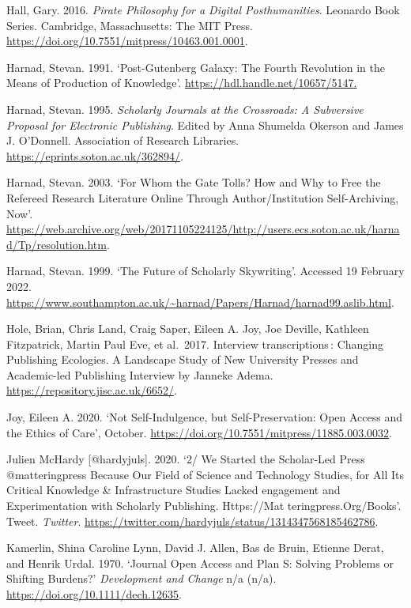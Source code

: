 \documentclass[a4paper,
fontsize=11pt,
oneside,
numbers=noperiodatend,
parskip=half-,
bibliography=totoc,
final
]{scrartcl}
\begin{document}
Hall, Gary. 2016. \emph{Pirate Philosophy for a Digital Posthumanities}.
Leonardo Book Series. Cambridge, Massachusetts: The MIT Press.
\url{https://doi.org/10.7551/mitpress/10463.001.0001}.

Harnad, Stevan. 1991. \enquote*{Post-Gutenberg Galaxy: The Fourth
Revolution in the Means of Production of Knowledge}.
\url{https://hdl.handle.net/10657/5147}\href{https://uh-ir.tdl.org/handle/10657/5147}{.}

Harnad, Stevan. 1995. \emph{Scholarly Journals at the Crossroads: A
Subversive Proposal for Electronic Publishing}. Edited by Anna Shumelda
Okerson and James J. O'Donnell. Association of Research Libraries.
\url{https://eprints.soton.ac.uk/362894/}.

Harnad, Stevan. 2003. \enquote*{For Whom the Gate Tolls? How and Why to
Free the Refereed Research Literature Online Through Author/Institution
Self-Archiving, Now}.
\url{https://web.archive.org/web/20171105224125/http://users.ecs.soton.ac.uk/harnad/Tp/resolution.htm}.

Harnad, Stevan. 1999. \enquote*{The Future of Scholarly Skywriting}.
Accessed 19 February 2022.
\url{https://www.southampton.ac.uk/~harnad/Papers/Harnad/harnad99.aslib.html}.

Hole, Brian, Chris Land, Craig Saper, Eileen A. Joy, Joe Deville,
Kathleen Fitzpatrick, Martin Paul Eve, et al.~2017. Interview
transcriptions\,: Changing Publishing Ecologies. A Landscape Study of
New University Presses and Academic-led Publishing Interview by Janneke
Adema. \url{https://repository.jisc.ac.uk/6652/}.

Joy, Eileen A. 2020. \enquote*{Not Self-Indulgence, but
Self-Preservation: Open Access and the Ethics of Care}, October.
\url{https://doi.org/10.7551/mitpress/11885.003.0032}.

Julien McHardy {[}@hardyjuls{]}. 2020. \enquote*{2/ We Started the
Scholar-Led Press @matteringpress Because Our Field of Science and
Technology Studies, for All Its Critical Knowledge \& Infrastructure
Studies Lacked engagement and Experimentation with Scholarly
Publishing. Https://Mat teringpress.Org/Books}. Tweet. \emph{Twitter}.
\url{https://twitter.com/hardyjuls/status/1314347568185462786}.

Kamerlin, Shina Caroline Lynn, David J. Allen, Bas de Bruin, Etienne
Derat, and Henrik Urdal. 1970. \enquote*{Journal Open Access and Plan S:
Solving Problems or Shifting Burdens?} \emph{Development and Change} n/a
(n/a). \url{https://doi.org/10.1111/dech.12635}.
\end{document}
